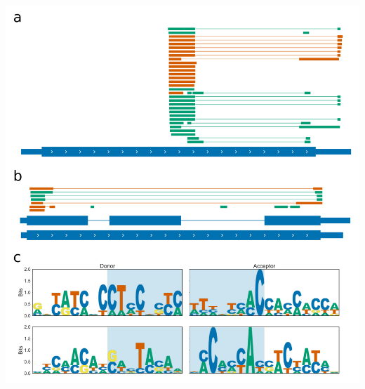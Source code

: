 \documentclass[12pt,a4paper,]{report}
\let\origfigure=\figure
\let\endorigfigure=\endfigure
\renewenvironment{figure}[1][2] {
    \expandafter\origfigure\expandafter[H]
} {
    \endorigfigure
}
\begin{document}
\begin{figure}[htbp]
\centering
\includegraphics[width=\textwidth,height=562pt,keepaspectratio]{chapter_6/figures/sanger_splice_variants.png}
\caption[Sanger sequencing of LRX1 and EXT9 cDNA identifies spliced forms]{\textbf{Sanger   sequencing   of   LRX1   and   EXT9   cDNA   identifies   spliced   forms}   \textbf{a)}   Gene   track   showing   aligned   sanger   sequencing   products   for   \textbf{a)}   LRX1   and   \textbf{b)}   EXT9.   Products   aligned   to   the   forward   strand   are   shown   in   green,   and   products   aligned   to   the   negative   strand   are   shown   in   orange.   Gene   models   are   from   the   Araport11   annotation.   \textbf{c)}   Sequence   logos   for   sanger   product   splice   junctions   for   LRX1   (top   panel)   and   EXT9   (lower   panel).   \label{sanger}}
\end{figure}
\end{document}

